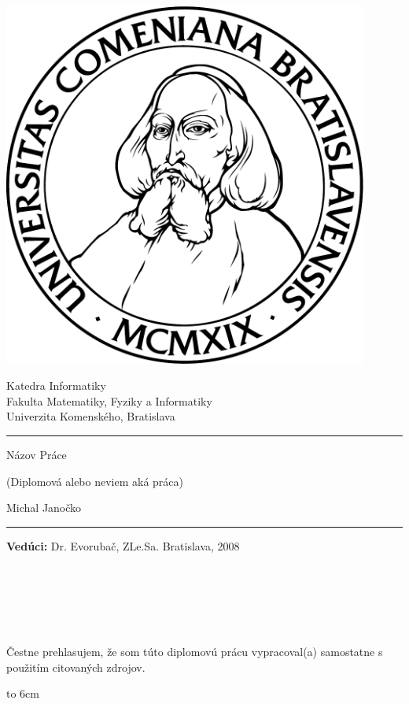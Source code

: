 \documentclass[12pt]{book}
\def\mftitle{Názov Práce}
\def\mfthesistype{Diplomová alebo neviem aká práca}
\def\mfauthor{Michal Janočko}
\def\mfadvisor{Dr. Evorubač, ZLe.Sa.}
\def\mfplacedate{Bratislava, 2008}
\begin{document}
\frontmatter

\thispagestyle{empty}

\noindent
\begin{minipage}{0.20\textwidth}
\includegraphics[width=0.9\textwidth]{komlogo-new}
\end{minipage}
\begin{minipage}{0.79\textwidth}
\begin{center}
\sc Katedra Informatiky \\
Fakulta Matematiky, Fyziky a Informatiky \\
Univerzita Komenského, Bratislava
\end{center}
\end{minipage}

\vfill
\begin{center}
\begin{minipage}{0.8\textwidth}
\hrule
\bigskip\bigskip
\centerline{\LARGE\sc\mftitle}
\smallskip
\centerline{(\mfthesistype)}
\bigskip
\bigskip
\centerline{\large\sc\mfauthor}
\bigskip\bigskip
\hrule
\end{minipage}
\end{center}
\vfill
{\bf Vedúci:} \mfadvisor
\hfill\mfplacedate
\eject %

\thispagestyle{empty}~\vfill\eject %

{~}\vspace{12cm}

\noindent
\begin{minipage}{0.25\textwidth}~\end{minipage}
\begin{minipage}{0.68\textwidth}
Čestne prehlasujem, že som túto diplomovú prácu vypracoval(a) samostatne s použitím citovaných zdrojov.

\bigskip\bigskip

\hfill\hbox to 6cm{\dotfill}
\end{minipage}
\vfill\eject %
~\vfill\eject %

\tableofcontents

\mainmatter




\backmatter

\nocite{*}


\end{document}
